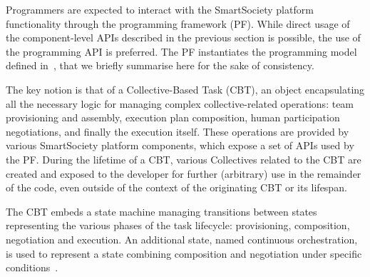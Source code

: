 

Programmers are expected to interact with the SmartSociety platform functionality through the programming framework (PF). While direct usage of the component-level APIs described in the previous section is possible, the use of the programming API is preferred. The PF instantiates the programming model defined in~\cite{D7.2}, that we briefly summarise here for the sake of consistency. 

The key notion is that of a Collective-Based Task (CBT), an object encapsulating all the necessary logic for managing complex collective-related operations: team provisioning and assembly, execution plan composition, human participation negotiations, and finally the execution itself. These operations are provided by various SmartSociety platform components, which expose a set of APIs used by the PF. During the lifetime of a CBT, various Collectives related to the CBT are created and exposed to the developer for further (arbitrary) use in the remainder of the code, even outside of the context of the originating CBT or its lifespan. 

The CBT embeds a state machine managing transitions between states representing the various phases of the task lifecycle: provisioning, composition, negotiation and execution. An additional state, named continuous orchestration, is used to represent a state combining composition and negotiation under specific conditions~\cite{D7.2}.

